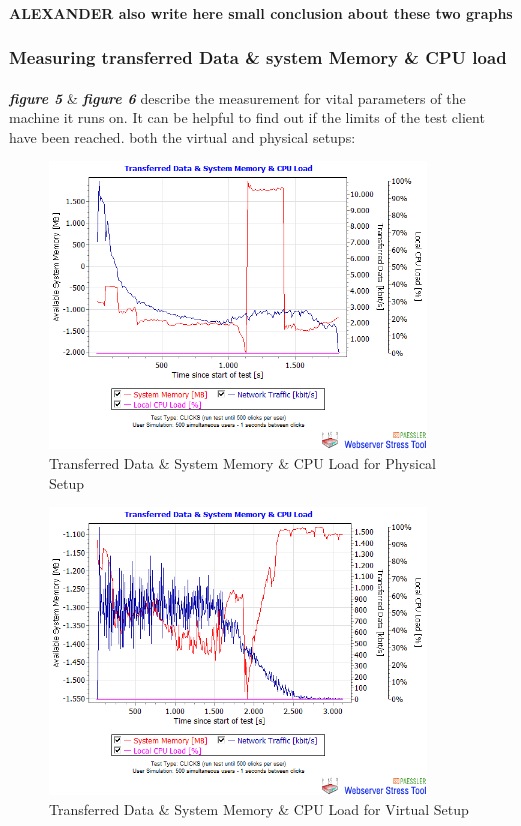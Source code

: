 \paragraph{}
\textbf{ALEXANDER also write here small conclusion about these two graphs}


\subsubsection{Measuring transferred Data \& system Memory \& CPU load}
\paragraph{}

\textbf{\textit{figure 5}} \& \textbf{\textit{figure 6}} describe the measurement for vital parameters of the machine it runs on. It can be helpful to find out if the limits of the test client have been reached. both the virtual and physical setups:
 

 \begin{figure}[H]
    \centering
    \includegraphics[width=10cm]{Pictures/ph1.png}
    \caption{Transferred Data \& System Memory \& CPU Load for Physical Setup}
    \label{fig:QQ3}
\end{figure}
   
 
\begin{figure}[H]
    \centering
    \includegraphics[width=10cm]{Pictures/vm1.png}
    \caption{Transferred Data \& System Memory \& CPU Load for Virtual Setup}
    \label{fig:QQ3}
\end{figure} 


